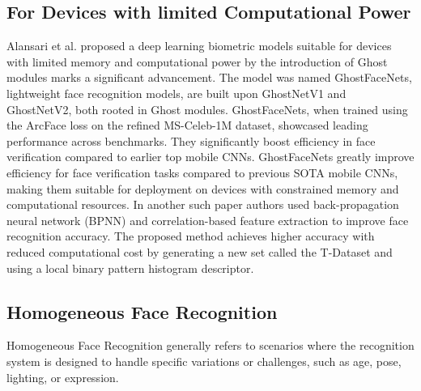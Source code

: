 \subsection{For Devices with limited Computational Power}

Alansari et al. \cite{alansari_ghostfacenets_2023} proposed a deep learning biometric models suitable for devices with limited memory and computational power by the introduction of Ghost modules marks a significant advancement. The model was named GhostFaceNets, lightweight face recognition models, are built upon GhostNetV1 and GhostNetV2, both rooted in Ghost modules. GhostFaceNets, when trained using the ArcFace loss on the refined MS-Celeb-1M dataset, showcased leading performance across benchmarks. They significantly boost efficiency in face verification compared to earlier top mobile CNNs. GhostFaceNets greatly improve efficiency for face verification tasks compared to previous SOTA mobile CNNs, making them suitable for deployment on devices with constrained memory and computational resources. In another such paper \cite{abuzneid_enhanced_2018} authors used back-propagation neural network (BPNN) and correlation-based feature extraction to improve face recognition accuracy. The proposed method achieves higher accuracy with reduced computational cost by generating a new set called the T-Dataset and using a local binary pattern histogram descriptor.

\subsection{Homogeneous Face Recognition}

Homogeneous Face Recognition generally refers to scenarios where the recognition system is designed to handle specific variations or challenges, such as age, pose, lighting, or expression.

